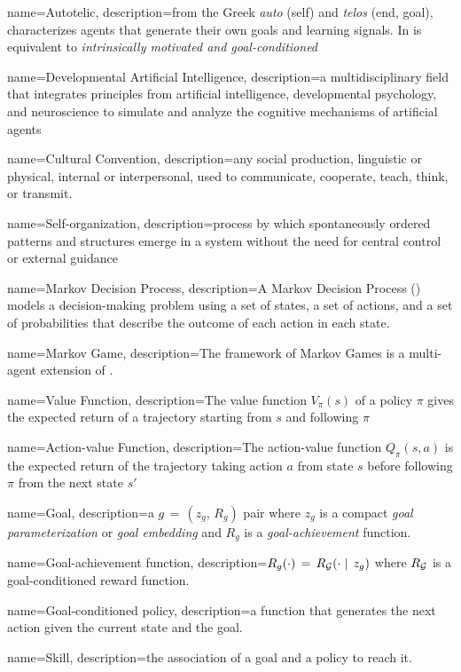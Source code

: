 \makeglossaries

{
    name=Autotelic,
    description={from the Greek \textit{auto} (self) and \textit{telos} (end, goal), characterizes agents that generate their own goals and learning signals. In is equivalent to \textit{intrinsically motivated and goal-conditioned}}
}

{
	name=Developmental Artificial Intelligence,
	description={a multidisciplinary field that integrates principles from artificial intelligence, developmental psychology, and neuroscience to simulate and analyze the cognitive mechanisms of artificial agents}
}


{
	name=Cultural Convention,
	description={any social production, linguistic or physical, internal or interpersonal, used to communicate, cooperate, teach, think, or transmit.}
}

{
	name=Self-organization,
	description={process by which spontaneously ordered patterns and structures emerge in a system without the need for central control or external guidance}
}

{
	name=Markov Decision Process,
	description={A Markov Decision Process (\mdp) models a decision-making problem using a set of states, a set of actions, and a set of probabilities that describe the outcome of each action in each state.}
}

{
	name=Markov Game,
	description={The framework of Markov Games is a multi-agent extension of \mdps.}
}

{
	name=Value Function,
	description={The value function $V_\pi(s)$ of a policy $\pi$ gives the expected return of a trajectory starting from $s$ and following $\pi$}
}

{
	name=Action-value Function,
	description={The action-value function $Q_\pi(s,a)$ is the expected return of the trajectory taking action $a$ from state $s$ before following $\pi$ from the next state $s'$}
}

{
	name=Goal,
	description={a $g\,=\,(z_g,\,R_g)$ pair where $z_g$ is a compact \textit{goal parameterization} or \textit{goal embedding} and $R_g$ is a \textit{goal-achievement} function.}
}

{
	name=Goal-achievement function,
	description={$R_g(\cdot)\,=\,R_{\mathcal{G}}(\cdot\mid\,z_g)$} where $R_{\mathcal{G}}$ is a goal-conditioned reward function.
}


{
	name=Goal-conditioned policy,
	description={a function that generates the next action given the current state and the goal.}
}

{
	name=Skill,
	description={the association of a goal and a policy to reach it.}
}


